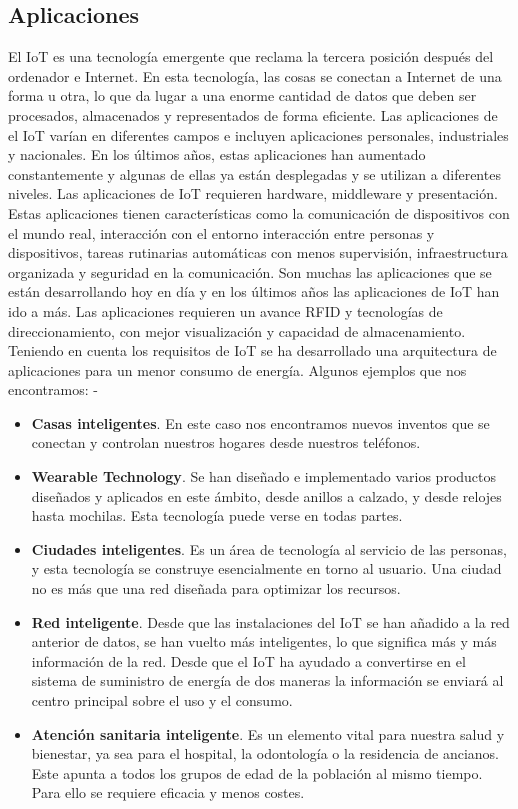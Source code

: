 {\subsection{Aplicaciones}

El IoT es una tecnología emergente que reclama la tercera posición después del ordenador e Internet. En esta tecnología, las cosas se conectan a Internet de una forma u otra, lo que da lugar a una enorme cantidad de datos que deben ser procesados, almacenados y representados de forma eficiente. Las aplicaciones de el IoT varían en diferentes campos e incluyen aplicaciones personales, industriales y nacionales. En los últimos años, estas aplicaciones han aumentado constantemente y algunas de ellas ya están desplegadas y se utilizan a diferentes niveles. Las aplicaciones de IoT requieren hardware, middleware y presentación. Estas aplicaciones tienen características como la comunicación de dispositivos con el mundo real, interacción con el entorno interacción entre personas y dispositivos, tareas rutinarias automáticas con menos supervisión, infraestructura organizada y seguridad en la comunicación. Son muchas las aplicaciones que se están desarrollando hoy en día y en los últimos años las aplicaciones de IoT han ido a más. Las aplicaciones requieren un avance RFID y tecnologías de direccionamiento, con mejor visualización y capacidad de almacenamiento. Teniendo en cuenta los requisitos de IoT se ha desarrollado una arquitectura de aplicaciones para un menor consumo de energía. Algunos ejemplos que nos encontramos: \cite{8320780}-\cite{tripathy2017internet}

\begin{itemize}
    \item \textbf{Casas inteligentes}. En este caso nos encontramos nuevos inventos que se conectan y controlan nuestros hogares desde nuestros teléfonos.
    \item \textbf{Wearable Technology}. Se han diseñado e implementado varios productos diseñados y aplicados en este ámbito, desde anillos a calzado, y desde relojes hasta mochilas. Esta tecnología puede verse en todas partes.
    \item \textbf{Ciudades inteligentes}. Es un área de tecnología al servicio de las personas, y esta tecnología se construye esencialmente en torno al usuario. Una ciudad no es más que una red diseñada para optimizar los recursos.
    \item \textbf{Red inteligente}. Desde que las instalaciones del IoT se han añadido a la red anterior de datos, se han vuelto más inteligentes, lo que significa más y más información de la red. Desde que el IoT ha ayudado a convertirse en el sistema de suministro de energía de dos maneras la información se enviará al centro principal sobre el uso y el consumo.
    \item \textbf{Atención sanitaria inteligente}. Es un elemento vital para nuestra salud y bienestar, ya sea para el hospital, la odontología o la residencia de ancianos. Este apunta a todos los grupos de edad de la población al mismo tiempo. Para ello se requiere eficacia y menos costes.
\end{itemize}

}
